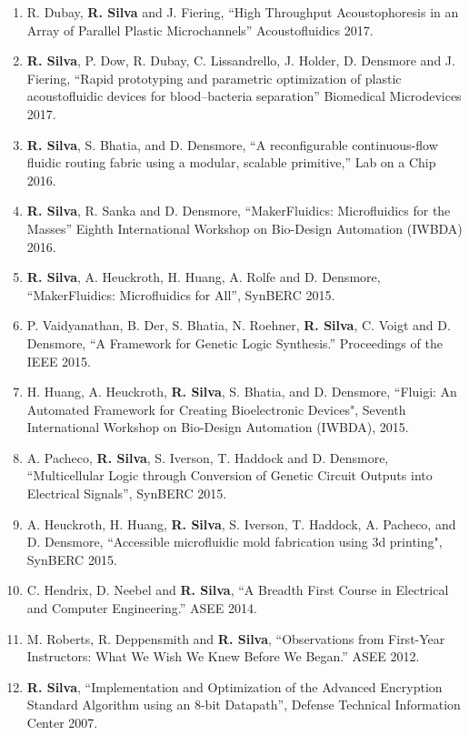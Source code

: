 \small
\begin{enumerate}
	\item{R. Dubay, \textbf{R. Silva} and J. Fiering, ``High Throughput Acoustophoresis in an Array of Parallel Plastic Microchannels'' Acoustofluidics 2017.}
	\item{\textbf{R. Silva}, P. Dow, R. Dubay, C. Lissandrello, J. Holder, D. Densmore and J. Fiering, ``Rapid prototyping and parametric optimization of plastic acoustofluidic devices for blood--bacteria separation'' Biomedical Microdevices 2017.}
	\item{\textbf{R. Silva}, S. Bhatia, and D. Densmore, ``A reconfigurable continuous-flow fluidic routing fabric using a modular, scalable primitive,'' Lab on a Chip 2016.}
	\item{\textbf{R. Silva}, R. Sanka and D. Densmore, ``MakerFluidics: Microfluidics for the Masses'' Eighth International Workshop on Bio-Design Automation (IWBDA) 2016.}
	\item{\textbf{R. Silva}, A. Heuckroth, H. Huang, A. Rolfe and D. Densmore, ``MakerFluidics: Microfluidics for All'', SynBERC 2015.}
	\item{P. Vaidyanathan, B. Der, S. Bhatia, N. Roehner, \textbf{R. Silva}, C. Voigt and D. Densmore, ``A Framework for Genetic Logic Synthesis.'' Proceedings of the IEEE 2015.}
	\item{H. Huang, A. Heuckroth, \textbf{R. Silva}, S. Bhatia, and D. Densmore, ``Fluigi: An Automated Framework for Creating Bioelectronic Devices", Seventh International Workshop on Bio-Design Automation (IWBDA), 2015.}
	\item{A. Pacheco, \textbf{R. Silva}, S. Iverson, T. Haddock and D. Densmore, ``Multicellular Logic through Conversion of Genetic Circuit Outputs into Electrical Signals'', SynBERC 2015.}
	\item{A. Heuckroth, H. Huang, \textbf{R. Silva}, S. Iverson, T. Haddock, A. Pacheco, and D. Densmore, ``Accessible microfluidic mold fabrication using 3d printing", SynBERC 2015.}
	\item{C. Hendrix, D. Neebel and \textbf{R. Silva}, ``A Breadth First Course in Electrical and Computer Engineering.'' ASEE 2014.}
	\item{M. Roberts, R. Deppensmith and \textbf{R. Silva}, ``Observations from First-Year Instructors: What We Wish We Knew Before We Began.'' ASEE 2012.}
	\item{\textbf{R. Silva}, ``Implementation and Optimization of the Advanced Encryption Standard Algorithm using an 8-bit Datapath'', Defense Technical Information Center 2007.}
\end{enumerate}


